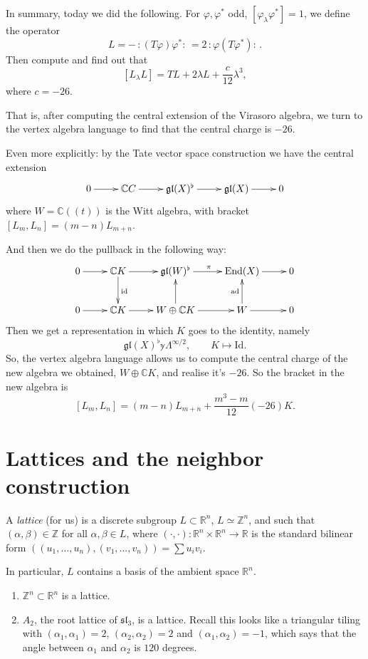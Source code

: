 \medskip\noindent
In summary, today we did the following.
For $\varphi, \varphi^*$ odd, $[\varphi_\lambda \varphi^*]=1$,
we define the operator
$$
L=-\,:\!(T\varphi)\varphi^*\!:\,=2\,:\!\varphi(T\varphi^*)\!:\,.
$$
Then compute and find out that
 $$
[L_\lambda L]=TL+2\lambda L+\frac{c}{12}\lambda^3,
$$
where $c=-26$.

That is, after computing the central extension
of the Virasoro algebra, we turn to the
vertex algebra language to find that the central
charge is $-26$.

Even more explicitly: by the Tate vector space construction
we have the central extension
$$
\xymatrix{
0\ar[r]&\mathbb{C}C\ar[r]&\mathfrak{gl}(X)^\flat\ar[r]&\mathfrak{gl}(X)\ar[r]&0
}
$$
where $W=\mathbb{C}((t))$ is the Witt algebra,
with bracket $[L_m,L_n]=(m-n)L_{m+n}$.

And then we do the pullback in the following way:
$$
\xymatrix{
0\ar[r]&\mathbb{C}K\ar[d]^{\text{id}}\ar[r]
&\mathfrak{gl}(W)^\flat\ar[r]^\pi
&\text{End}(X)\ar[r]&0\\
0\ar[r]&\mathbb{C}K\ar[r]&W \oplus \mathbb{C} K\ar[u]\ar[r]
& W\ar[u]^{\text{ad}}\ar[r]&0
}
$$
Then we get a representation in which $K$ goes to the identity,
namely
$$
\mathfrak{gl}(X)^\flat \mathbb{y} \Lambda^{\infty/2},
\qquad K \mapsto \text{Id}.
$$
So, the vertex algebra language allows us to compute
the central charge of the new algebra we obtained,
$W \oplus \mathbb{C}K$,
and realise it's $-26$. So the bracket in the new algebra is
 $$
[L_m,L_n]=(m-n)L_{m+n}+\frac{m^3-m}{12}(-26)K.
$$

\section{Lattices and the neighbor construction}
\label{section-lattices}

\begin{definition}
\label{definition-lattice}
A {\it lattice} (for us) is a discrete subgroup $L \subset \mathbb{R}^n$,
$L \simeq \mathbb{Z}^n$, and such that $(\alpha,\beta) \in \mathbb{Z}$ 
for all $\alpha, \beta \in L$,
where $(\cdot,\cdot):\mathbb{R}^n \times \mathbb{R}^n \to \mathbb{R}$ 
is the standard bilinear form
$((u_1,\ldots,u_n),(v_1,\ldots,v_n))=\sum u_iv_i$.
\end{definition}

\noindent
In particular, $L$ contains a basis of the 
ambient space $\mathbb{R}^n$.

\begin{example}
\label{example-lattices}
\begin{enumerate}
\item $\mathbb{Z}^n \subset \mathbb{R}^n$ is a lattice.
\item $A_2$, the root lattice of $\mathfrak{sl}_3$, is a lattice.
Recall this looks like a triangular tiling with
$(\alpha_1,\alpha_1)=2$, $(\alpha_2,\alpha_2)=2$ 
and $(\alpha_1,\alpha_2)=-1$, which says
that the angle between $\alpha_1$ and $\alpha_2$ is $120$ degrees. 
\end{enumerate}
\end{example}


